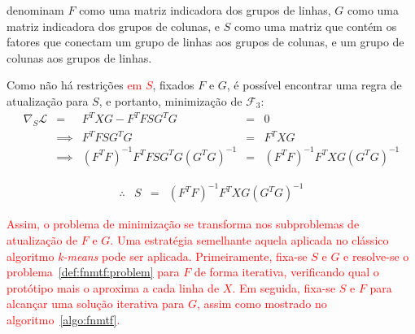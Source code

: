 \documentclass[
    12pt,                %
    oneside,            %
    a4paper,            %
    english,            %
    brazil                %
    ]{abntex2ppgsi}
\begin{document}


 denominam $F$ como uma matriz indicadora dos grupos de linhas, $G$ como uma matriz indicadora dos grupos de colunas, e $S$ como uma matriz que contém os fatores que conectam um grupo de linhas aos grupos de colunas, e um grupo de colunas aos grupos de linhas.  %

Como não há restrições \textcolor{red}{em $S$}, fixados $F$ e $G$, é possível encontrar uma regra de atualização para $S$, e portanto, minimização de $\mathcal{F}_3$:
\[
    \begin{array}{lclcl}
        \nabla_S \mathcal{L} &     =    & F^T X G - F^T F S G^T G                 & = & 0                                 \\
                             & \implies & F^TFSG^TG                               & = & F^TXG                             \\
                             & \implies & (F^T F)^{-1} F^T F S G^T G (G^T G)^{-1} & = & (F^T F)^{-1} F^T X G (G^T G)^{-1}
    \end{array}   \nonumber
\]

\begin{equation}
\label{eq:fnmtf:updateS}
    \begin{array}{lclcl}
        \therefore & S & = & (F^T F)^{-1} F^T X G (G^T G)^{-1}    \nonumber
    \end{array}
\end{equation}

\textcolor{red}{Assim, o problema de minimização se transforma nos subproblemas de atualização de $F$ e $G$. Uma estratégia semelhante aquela aplicada no clássico algoritmo \textit{k-means} pode ser aplicada. Primeiramente, fixa-se $S$ e $G$ e resolve-se o problema~\ref{def:fnmtf:problem} para $F$ de forma iterativa, verificando qual o protótipo mais o aproxima a cada linha de $X$. Em seguida, fixa-se $S$ e $F$ para alcançar uma solução iterativa para $G$, assim como mostrado no algoritmo~\ref{algo:fnmtf}.}
\end{document}

